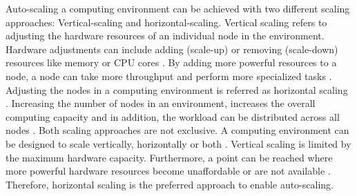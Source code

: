 Auto-scaling a computing environment can be achieved with two different scaling approaches: Vertical-scaling and horizontal-scaling.
Vertical scaling refers to adjusting the hardware resources of an individual node in the environment. Hardware adjustments can include adding (scale-up) or removing (scale-down) resources like memory or CPU cores \cite{Wilder2012CloudPatterns}. By adding more powerful resources to a node, a node can take more throughput and perform more specialized tasks \cite{Abbott2015ScalabilityArt}.
Adjusting the nodes in a computing environment is referred as horizontal scaling \cite{Wilder2012CloudPatterns}. Increasing the number of nodes in an environment, increases the overall computing capacity and in addition, the workload can be distributed across all nodes \cite{Wilder2012CloudPatterns, Abbott2015ScalabilityArt}.
Both scaling approaches are not exclusive. A computing environment can be designed to scale vertically, horizontally or both \cite{Wilder2012CloudPatterns}.
Vertical scaling is limited by the maximum hardware capacity. Furthermore, a point can be reached where more powerful hardware resources become unaffordable or are not available \cite{Abbot2011ScalabilityRules}.  Therefore, horizontal scaling is the preferred approach to enable auto-scaling.


